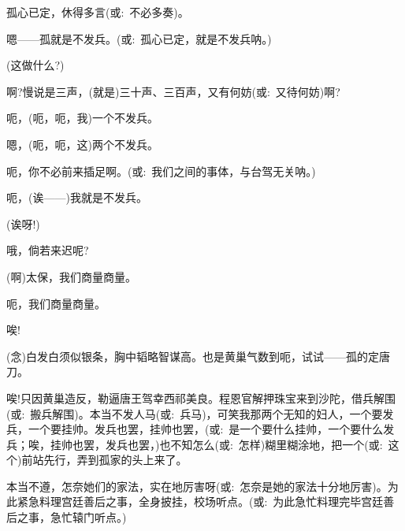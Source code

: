 {孤心已定，休得多言({\akai 或}:~不必多奏)。

嗯------孤就是不发兵。({\akai 或}:~孤心已定，就是不发兵呐。)

(这做什么?)

啊?慢说是三声，(就是)三十声、三百声，又有何妨({\akai 或}:~又待何妨)啊?

呃，(呃，呃，我)一个不发兵。

嗯，(呃，呃，这)两个不发兵。

呃，你不必前来插足啊。({\akai 或}:~我们之间的事体，与台驾无关呐。)

呃，(诶------)我就是不发兵。

(诶呀!)\hspace{20pt}~

哦，倘若来迟呢?

(啊)太保，我们商量商量。

呃，我们商量商量。

唉!\hspace{40pt}~




\vspace{5pt}

({\akai 念})白发白须似银条，胸中韬略智谋高。也是黄巢气数到呃，试试------孤的定唐刀。

唉!只因黄巢造反，勒逼唐王驾幸西祁美良。程恩官解押珠宝来到沙陀，借兵解围({\akai 或}:~搬兵解围)。本当不发人马({\akai 或}:~兵马)，可笑我那两个无知的妇人，一个要发兵，一个要挂帅。发兵也罢，挂帅也罢，({\akai 或}:~是一个要什么挂帅，一个要什么发兵；唉，挂帅也罢，发兵也罢，)也不知怎么({\akai 或}:~怎样)糊里糊涂地，把一个({\akai 或}:~这个)前站先行，弄到孤家的头上来了。

本当不遵，怎奈她们的家法，实在地厉害呀({\akai 或}:~怎奈是她的家法十分地厉害)。为此紧急料理宫廷善后之事，全身披挂，校场听点。({\akai 或}:~为此急忙料理完毕宫廷善后之事，急忙辕门听点。)

}
